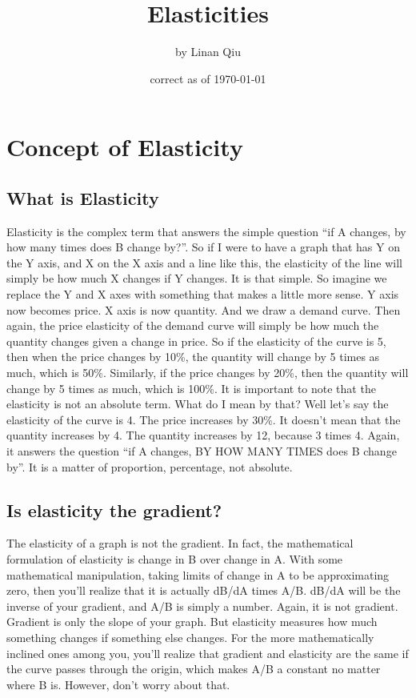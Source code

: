 \documentclass[DIV=calc,11pt,parskip,numbers=noenddot]{scrartcl} %
\title{Elasticities}
\author{\large by Linan Qiu}
\date{\small correct as of \today}
\begin{document}
\maketitle
\tableofcontents
\section{Concept of Elasticity}
\subsection{What is Elasticity}
Elasticity is the complex term that answers the simple question “if A changes, by how many times does B change by?”. So if I were to have a graph that has Y on the Y axis, and X on the X axis and a line like this, the elasticity of the line will simply be how much X changes if Y changes. It is that simple. So imagine we replace the Y and X axes with something that makes a little more sense. Y axis now becomes price. X axis is now quantity. And we draw a demand curve. Then again, the price elasticity of the demand curve will simply be how much the quantity changes given a change in price. So if the elasticity of the curve is 5, then when the price changes by 10\%, the quantity will change by 5 times as much, which is 50\%. Similarly, if the price changes by 20\%, then the quantity will change by 5 times as much, which is 100\%. It is important to note that the elasticity is not an absolute term. What do I mean by that? Well let’s say the elasticity of the curve is 4. The price increases by 30\%. It doesn’t mean that the quantity increases by 4. The quantity increases by 12, because 3 times 4. Again, it answers the question “if A changes, BY HOW MANY TIMES does B change by”. It is a matter of proportion, percentage, not absolute. 
\subsection{Is elasticity the gradient?}
The elasticity of a graph is not the gradient. In fact, the mathematical formulation of elasticity is change in B over change in A. With some mathematical manipulation, taking limits of change in A to be approximating zero, then you’ll realize that it is actually dB/dA times A/B. dB/dA will be the inverse of your gradient, and A/B is simply a number. Again, it is not gradient. Gradient is only the slope of your graph. But elasticity measures how much something changes if something else changes. For the more mathematically inclined ones among you, you’ll realize that gradient and elasticity are the same if the curve passes through the origin, which makes A/B a constant no matter where B is. However, don’t worry about that.
\end{document}
